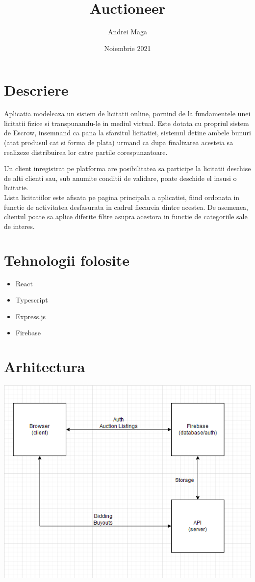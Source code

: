 \documentclass[12pt]{article}
\title{Auctioneer}
\author{Andrei Maga}
\date{Noiembrie 2021}
\begin{document}
	\begin{titlepage}
		
		\maketitle
	\end{titlepage}
	\pagebreak
	
	\section{Descriere}
	Aplicatia modeleaza un sistem de licitatii online, pornind de la fundamentele unei licitatii fizice si transpunandu-le in mediul virtual. Este dotata cu propriul sistem de Escrow, insemnand ca pana la sfarsitul licitatiei, sistemul detine ambele bunuri (atat produsul cat si forma de plata) urmand ca dupa finalizarea acesteia sa realizeze distribuirea lor catre partile corespunzatoare.
	
	Un client inregistrat pe platforma are posibilitatea sa participe la licitatii deschise de alti clienti sau, sub anumite conditii de validare, poate deschide el insusi o licitatie.\\
	Lista licitatiilor este afisata pe pagina principala a aplicatiei, fiind ordonata in functie de activitatea desfasurata in cadrul fiecareia dintre acestea.
	De asemenea, clientul poate sa aplice diferite filtre asupra acestora in functie de categoriile sale de interes.

	\pagebreak

	\section{Tehnologii folosite}

	\begin{itemize}
		\item React
		\item Typescript
		\item Express.js
		\item Firebase
	\end{itemize}


	\section{Arhitectura}
	\includegraphics{archi}
\end{document}
